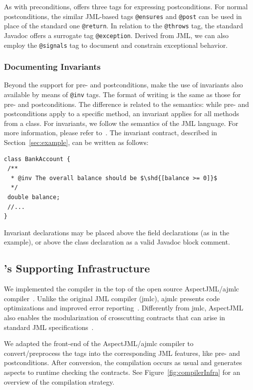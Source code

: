 As with preconditions, \contractjdoc{} offers three tags for expressing postconditions.
For normal postconditions, the similar JML-based tags \lstinline!@ensures!
and \lstinline!@post! can be used in place of the standard one \lstinline!@return!.
In relation to the \lstinline!@throws! tag, the standard Javadoc offers a surrogate tag
\lstinline!@exception!. Derived from JML, we can also employ
the \lstinline!@signals! tag to document and constrain exceptional behavior.


\subsubsection{Documenting Invariants}

Beyond the support for pre- and postconditions, \contractjdoc{} make the use of invariants also
available by means of \texttt{@inv} tags.
The format of writing is the same as those
for pre- and postconditions.
The difference is related to the semantics: while pre- and postconditions apply to a specific
method, an invariant applies for all methods from a class. For invariants, we follow the
semantics of the JML language. For more information, please refer
to~\cite{jml}.
The invariant contract, described in Section~\ref{sec:example}, can be written
as follows:
\begin{lstlisting}[basicstyle=\footnotesize\ttfamily,name=figxpi, frame=lines, mathescape=true]
class BankAccount {
 /**
  * @inv The overall balance should be $\shd{[balance >= 0]}$
  */
 double balance;
 //...
}
\end{lstlisting}
Invariant declarations may be placed above the field
declarations (as in the example), or  above the
class declaration as a valid Javadoc block comment.

\subsection{\contractjdoc{}'s Supporting Infrastructure}

We implemented the \contractjdoc{} compiler in the top of
the open source AspectJML/ajmlc compiler~\cite{aspectjml,ajmlc,Rebelo-etal08}.
Unlike the original JML compiler (jmlc), ajmlc presents code
optimizations and improved error reporting~\cite{ajmlc}.
Differently from jmlc, AspectJML also enables the modularization
of crosscutting contracts that can arise in standard
JML specifications~\cite{aspectjml}.

We adapted the front-end of the AspectJML/ajmlc compiler
to convert/preprocess
the \contractjdoc{} tags into the corresponding JML
features, like pre- and postconditions.
After conversion, the compilation occurs as usual and
generates aspects to runtime checking the
contracts. See Figure~\ref{fig:compilerInfra}
for an overview of the compilation strategy.


